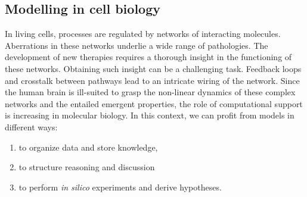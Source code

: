 \documentclass{bmcart}
\begin{document}
\subsection*{Modelling in cell biology}
In living cells, processes are regulated by networks of interacting molecules.
Aberrations in these networks underlie a wide range of pathologies. The development of new therapies
requires a thorough insight in the functioning of these networks. Obtaining such insight can be a challenging task.
Feedback loops and crosstalk between pathways lead to an intricate wiring of the network.
Since the human brain is ill-suited to grasp the non-linear dynamics of these complex networks and
the entailed emergent properties, the role of computational support is increasing
in molecular biology.
% 
% 
%
In this context, we can profit from models in different ways:
\begin{enumerate}
  \item to organize data and store knowledge,
  \item to structure reasoning and discussion
  \item to perform \emph{in silico} experiments and derive hypotheses.
\end{enumerate}
\end{document}
